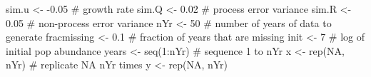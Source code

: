 \begin{Schunk}
\begin{Sinput}
 sim.u <- -0.05 # growth rate
 sim.Q <- 0.02 # process error variance
 sim.R <- 0.05 # non-process error variance
 nYr <- 50 # number of years of data to generate
 fracmissing <- 0.1 # fraction of years that are missing
 init <- 7 # log of initial pop abundance
 years <- seq(1:nYr) # sequence 1 to nYr
 x <- rep(NA, nYr) # replicate NA nYr times
 y <- rep(NA, nYr)
\end{Sinput}
\end{Schunk}
